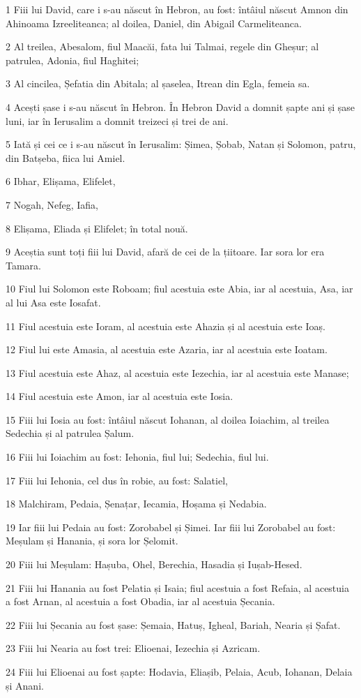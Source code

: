 \par 1 Fiii lui David, care i s-au născut în Hebron, au fost: întâiul născut Amnon din Ahinoama Izreeliteanca; al doilea, Daniel, din Abigail Carmeliteanca.
\par 2 Al treilea, Abesalom, fiul Maacăi, fata lui Talmai, regele din Gheșur; al patrulea, Adonia, fiul Haghitei;
\par 3 Al cincilea, Șefatia din Abitala; al șaselea, Itrean din Egla, femeia sa.
\par 4 Acești șase i s-au născut în Hebron. În Hebron David a domnit șapte ani și șase luni, iar în Ierusalim a domnit treizeci și trei de ani.
\par 5 Iată și cei ce i s-au născut în Ierusalim: Șimea, Șobab, Natan și Solomon, patru, din Batșeba, fiica lui Amiel.
\par 6 Ibhar, Elișama, Elifelet,
\par 7 Nogah, Nefeg, Iafia,
\par 8 Elișama, Eliada și Elifelet; în total nouă.
\par 9 Aceștia sunt toți fiii lui David, afară de cei de la țiitoare. Iar sora lor era Tamara.
\par 10 Fiul lui Solomon este Roboam; fiul acestuia este Abia, iar al acestuia, Asa, iar al lui Asa este Iosafat.
\par 11 Fiul acestuia este Ioram, al acestuia este Ahazia și al acestuia este Ioaș.
\par 12 Fiul lui este Amasia, al acestuia este Azaria, iar al acestuia este Ioatam.
\par 13 Fiul acestuia este Ahaz, al acestuia este Iezechia, iar al acestuia este Manase;
\par 14 Fiul acestuia este Amon, iar al acestuia este Iosia.
\par 15 Fiii lui Iosia au fost: întâiul născut Iohanan, al doilea Ioiachim, al treilea Sedechia și al patrulea Șalum.
\par 16 Fiii lui Ioiachim au fost: Iehonia, fiul lui; Sedechia, fiul lui.
\par 17 Fiii lui Iehonia, cel dus în robie, au fost: Salatiel,
\par 18 Malchiram, Pedaia, Șenațar, Iecamia, Hoșama și Nedabia.
\par 19 Iar fiii lui Pedaia au fost: Zorobabel și Șimei. Iar fiii lui Zorobabel au fost: Meșulam și Hanania, și sora lor Șelomit.
\par 20 Fiii lui Meșulam: Hașuba, Ohel, Berechia, Hasadia și Iușab-Hesed.
\par 21 Fiii lui Hanania au fost Pelatia și Isaia; fiul acestuia a fost Refaia, al acestuia a fost Arnan, al acestuia a fost Obadia, iar al acestuia Șecania.
\par 22 Fiii lui Șecania au fost șase: Șemaia, Hatuș, Igheal, Bariah, Nearia și Șafat.
\par 23 Fiii lui Nearia au fost trei: Elioenai, Iezechia și Azricam.
\par 24 Fiii lui Elioenai au fost șapte: Hodavia, Eliașib, Pelaia, Acub, Iohanan, Delaia și Anani.

